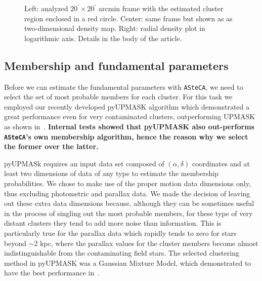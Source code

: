 \documentclass[referee]{aa}
\begin{document}
  \begin{figure}
   \caption{Left: analyzed $20^{\prime} \times 20^{\prime}$ arcmin frame with the
   estimated cluster region enclosed in a red circle. Center: same frame but
   shown as as two-dimensional density map. Right: radial density plot in
   logarithmic axis. Details in the body of the article.}
   \label{fig:BER29_struct}
  \end{figure}




 \subsection{Membership and fundamental parameters}
  \label{ssec:fund_pars}

  Before we can estimate the fundamental parameters with \texttt{ASteCA}, we
  need to select the set of most probable members for each cluster. For this
  task we employed our recently developed pyUPMASK algorithm which demonstrated
  a great performance even for very contaminated clusters, outperforming
  UPMASK~\citep{Krone2014} as shown in~\cite{Pera_2021}. \textbf{Internal tests
  showed that pyUPMASK also out-performs \texttt{ASteCA}'s own membership
  algorithm, hence the reason why we select the former over the latter.}

  pyUPMASk requires an input data set composed of $(\alpha, \delta)$ coordinates
  and at least two dimensions of data of any type to estimate the membership
  probabilities. We chose to make use of the proper motion data dimensions only,
  thus excluding photometric and parallax data.
  We made the decision of leaving out these extra data dimensions because,
  although they can be sometimes useful in the process of singling out the most
  probable members, for these type of very distant clusters they tend to add
  more noise than information.
  This is particularly true for the parallax data which
  rapidly tends to zero for stars beyond $\sim$2 kpc, where the parallax values
  for the cluster members become almost indistinguishable from the contaminating
  field stars. The selected clustering method in pyUPMASK was a Gaussian Mixture
  Model, which demonstrated to have the best performance
  in~\citet[][see Sect. 4]{Pera_2021}.
\end{document}

